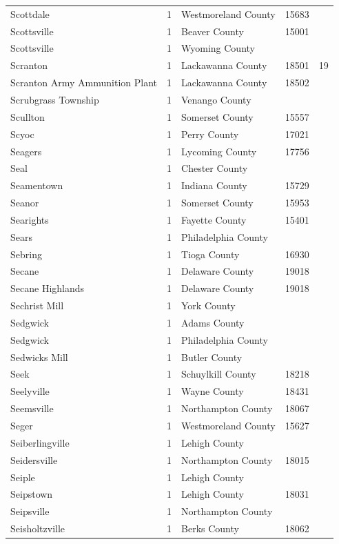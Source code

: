 \documentclass{article}
\begin{document}
\begin{tabular}{lllll}
Scottdale & 1 & Westmoreland County & 15683 &  \\
Scottsville & 1 & Beaver County & 15001 &  \\
Scottsville & 1 & Wyoming County &  &  \\
Scranton & 1 & Lackawanna County & 18501 & 19 \\
Scranton Army Ammunition Plant & 1 & Lackawanna County & 18502 &  \\
Scrubgrass Township & 1 & Venango County &  &  \\
Scullton & 1 & Somerset County & 15557 &  \\
Scyoc & 1 & Perry County & 17021 &  \\
Seagers & 1 & Lycoming County & 17756 &  \\
Seal & 1 & Chester County &  &  \\
Seamentown & 1 & Indiana County & 15729 &  \\
Seanor & 1 & Somerset County & 15953 &  \\
Searights & 1 & Fayette County & 15401 &  \\
Sears & 1 & Philadelphia County &  &  \\
Sebring & 1 & Tioga County & 16930 &  \\
Secane & 1 & Delaware County & 19018 &  \\
Secane Highlands & 1 & Delaware County & 19018 &  \\
Sechrist Mill & 1 & York County &  &  \\
Sedgwick & 1 & Adams County &  &  \\
Sedgwick & 1 & Philadelphia County &  &  \\
Sedwicks Mill & 1 & Butler County &  &  \\
Seek & 1 & Schuylkill County & 18218 &  \\
Seelyville & 1 & Wayne County & 18431 &  \\
Seemsville & 1 & Northampton County & 18067 &  \\
Seger & 1 & Westmoreland County & 15627 &  \\
Seiberlingville & 1 & Lehigh County &  &  \\
Seidersville & 1 & Northampton County & 18015 &  \\
Seiple & 1 & Lehigh County &  &  \\
Seipstown & 1 & Lehigh County & 18031 &  \\
Seipsville & 1 & Northampton County &  &  \\
Seisholtzville & 1 & Berks County & 18062 &  \\

\end{tabular}
\end{document}
